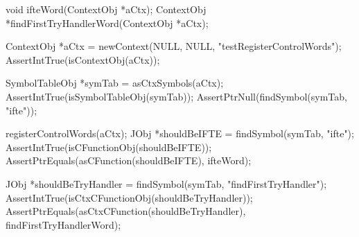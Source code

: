 \startCHeader
void ifteWord(ContextObj *aCtx);
ContextObj *findFirstTryHandlerWord(ContextObj *aCtx);
\stopCHeader

\startCTest
  ContextObj *aCtx = newContext(NULL, NULL, "testRegisterControlWords");
  AssertIntTrue(isContextObj(aCtx));
  
  SymbolTableObj *symTab = asCtxSymbols(aCtx);
  AssertIntTrue(isSymbolTableObj(symTab));
  AssertPtrNull(findSymbol(symTab, "ifte"));
  
  registerControlWords(aCtx);
  JObj *shouldBeIFTE = findSymbol(symTab, "ifte");
  AssertIntTrue(isCFunctionObj(shouldBeIFTE));
  AssertPtrEquals(asCFunction(shouldBeIFTE), ifteWord);
  
  JObj *shouldBeTryHandler = findSymbol(symTab, "findFirstTryHandler");
  AssertIntTrue(isCtxCFunctionObj(shouldBeTryHandler));
  AssertPtrEquals(asCtxCFunction(shouldBeTryHandler), findFirstTryHandlerWord);
\stopCTest
\stopTestCase
\stopTestSuite